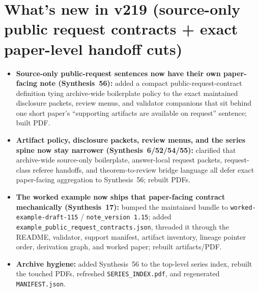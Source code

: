 \documentclass[11pt]{article}
\begin{document}
\section{What's new in v219 (source-only public request contracts + exact paper-level handoff cuts)}
\begin{itemize}[leftmargin=*]
\item \textbf{Source-only public-request sentences now have their own paper-facing note (Synthesis~56):} added a compact public-request-contract definition tying archive-wide boilerplate policy to the exact maintained disclosure packets, review menus, and validator companions that sit behind one short paper's ``supporting artifacts are available on request'' sentence; built PDF.
\item \textbf{Artifact policy, disclosure packets, review menus, and the series spine now stay narrower (Synthesis~6/52/54/55):} clarified that archive-wide source-only boilerplate, answer-local request packets, request-class referee handoffs, and theorem-to-review bridge language all defer exact paper-facing aggregation to Synthesis~56; rebuilt PDFs.
\item \textbf{The worked example now ships that paper-facing contract mechanically (Synthesis~17):} bumped the maintained bundle to \texttt{worked-example-draft-115} / \texttt{note\_version 1.15}; added \texttt{example\_public\_request\_contracts.json}, threaded it through the README, validator, support manifest, artifact inventory, lineage pointer order, derivation graph, and worked paper; rebuilt artifacts/PDF.
\item \textbf{Archive hygiene:} added Synthesis~56 to the top-level series index, rebuilt the touched PDFs, refreshed \texttt{SERIES\_INDEX.pdf}, and regenerated \texttt{MANIFEST.json}.
\end{itemize}
\end{document}
